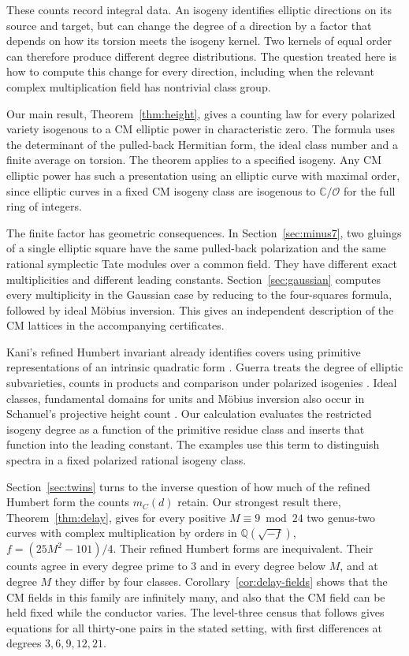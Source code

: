 \documentclass[11pt,letterpaper]{amsart}
\theoremstyle{definition}
\numberwithin{equation}{section}
\newcommand{\Q}{\mathbb Q}
\newcommand{\C}{\mathbb C}
\newcommand{\OO}{\mathcal O}
\begin{document}
These counts record integral data. An isogeny identifies elliptic
directions on its source and target, but can change the degree of a
direction by a factor that depends on how its torsion meets the
isogeny kernel. Two kernels of equal order can therefore produce
different degree distributions. The question treated here is how to
compute this change for every direction, including when the relevant
complex multiplication field has nontrivial class group.

Our main result, Theorem~\ref{thm:height}, gives a counting law for
every polarized variety isogenous to a CM elliptic power in
characteristic zero. The formula uses the determinant of the
pulled-back Hermitian form, the ideal class number and a finite
average on torsion. The theorem applies to a specified isogeny. Any
CM elliptic power has such a presentation using an elliptic curve
with maximal order, since elliptic curves in a fixed CM isogeny
class are isogenous to \(\C/\OO\) for the full ring of integers.

The finite factor has geometric consequences. In
Section~\ref{sec:minus7}, two gluings of a single elliptic square have
the same pulled-back polarization and the same rational symplectic
Tate modules over a common field. They have different exact
multiplicities and different leading constants. Section~\ref{sec:gaussian}
computes every multiplicity in the Gaussian case by reducing to the
four-squares formula, followed by ideal M\"obius inversion. This gives
an independent description of the CM lattices in the accompanying
certificates.

Kani's refined Humbert invariant already identifies covers using
primitive representations of an intrinsic quadratic form
\cite{KaniI,KaniII}. Guerra treats the degree of elliptic subvarieties,
counts in products and comparison under polarized isogenies
\cite[Sections 6 and 7]{Guerra19}. Ideal classes, fundamental
domains for units and M\"obius inversion also occur in Schanuel's
projective height count \cite{Schanuel}. Our calculation evaluates the
restricted isogeny degree as a function of the primitive residue
class and inserts that function into the leading constant. The
examples use this term to distinguish spectra in a fixed polarized
rational isogeny class.

Section~\ref{sec:twins} turns to the inverse question of how much of
the refined Humbert form the counts \(m_C(d)\) retain. Our strongest
result there, Theorem~\ref{thm:delay}, gives for every positive
\(M\equiv9\bmod24\) two genus-two curves with complex multiplication by
orders in \(\Q(\sqrt{-f})\), \(f=(25M^2-101)/4\). Their refined Humbert
forms are inequivalent. Their counts agree in every degree prime to
\(3\) and in every degree below \(M\), and at degree \(M\) they differ
by four classes. Corollary~\ref{cor:delay-fields} shows that the CM
fields in this family are infinitely many, and also that the CM field
can be held fixed while the conductor varies. The level-three census
that follows gives equations for all thirty-one pairs in the stated
setting, with first differences at degrees \(3,6,9,12,21\).
\end{document}
